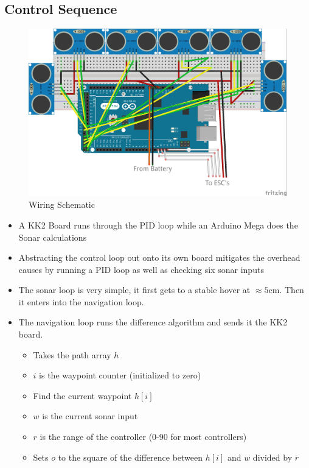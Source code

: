 \documentclass{lposter}
\theoremstyle{plain}
\theoremstyle{definition}
\begin{document}
\begin{poster}
\section{Control Sequence}


\begin{figure}
\centering
\includegraphics[scale=.9]{quad_fr.jpg}
\caption{Wiring Schematic\newline}
\label{fig:mig_over}
\end{figure}



\begin{itemize}
\item A KK2 Board runs through the PID loop while an Arduino Mega does the Sonar calculations
\item Abstracting the control loop out onto its own board mitigates the overhead causes by running a PID loop as well as checking six sonar inputs
\item The sonar loop is very simple, it first gets to a stable hover at $\approx 5$cm. Then it enters into the navigation loop.
\item The navigation loop runs the difference algorithm and sends it the KK2 board.

\begin{itemize}
\item Takes the path array $h$
\item $i$ is the waypoint counter (initialized to zero)
\item Find the current waypoint $h[i]$
\item $w$ is the current sonar input
\item $r$ is the range of the controller (0-90 for most controllers)
\item Sets $o$ to the square of the difference between $h[i]$ and $w$ divided by $r$


\end{itemize}
\end{itemize}
\end{poster}
\end{document}
